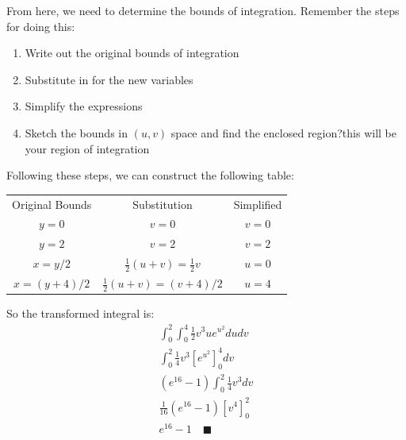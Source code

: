 \documentclass[letterpaper, 11pt]{article}
\begin{document}
\begin{enumerate}
\par From here, we need to determine the bounds of integration. Remember the steps for doing this:
\begin{enumerate}[label=\roman*.]
\item Write out the original bounds of integration
\item Substitute in for the new variables
\item Simplify the expressions
\item Sketch the bounds in $(u,v)$ space and find the enclosed region?this will be your region of integration
\end{enumerate}
Following these steps, we can construct the following table:
\begin{center}
\begin{tabular}{ c c c }
 Original Bounds & Substitution & Simplified \\ 
 $y = 0$ & $v = 0$ & $v = 0$ \\  
 $y = 2$ & $v = 2$ & $v = 2$   \\  
 $x = y/2$ & $\frac{1}{2} (u + v) = \frac{1}{2}v$ & $u = 0$   \\  
 $x = (y + 4)/2$ & $\frac{1}{2} (u + v) = (v + 4)/2$ & $ u = 4$
\end{tabular}
\end{center}

So the transformed integral is:
\begin{gather*}
\int_0^2 \int_0^4 \frac{1}{2} v^3 ue^{u^2} dudv  \\
\int_0^2 \frac{1}{4}v^3 \left[ e^{u^2} \right]_0^4 dv \\
(e^{16} - 1) \int_0^2 \frac{1}{4}v^3 dv \\
\frac{1}{16} (e^{16}-1) \left[ v^4 \right]_0^2 \\
e^{16}-1 \quad\blacksquare
\end{gather*}

\end{enumerate}
\end{document}
